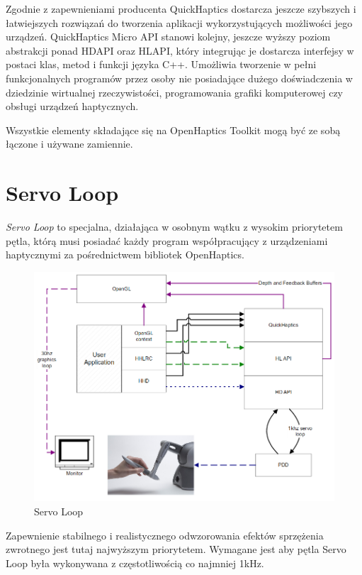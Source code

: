 \documentclass[licencjacka]{pracamgr}
\begin{document}
Zgodnie z zapewnieniami producenta QuickHaptics dostarcza jeszcze szybszych i łatwiejszych rozwiązań do tworzenia aplikacji wykorzystujących możliwości jego urządzeń. QuickHaptics Micro API stanowi kolejny, jeszcze wyższy poziom abstrakcji ponad HDAPI oraz HLAPI, który integrując je dostarcza interfejsy w postaci klas, metod i funkcji języka C++. Umożliwia tworzenie w pełni funkcjonalnych programów przez osoby nie posiadające dużego doświadczenia w dziedzinie wirtualnej rzeczywistości, programowania grafiki komputerowej czy obsługi urządzeń haptycznych.

Wszystkie elementy składające się na OpenHaptics Toolkit mogą być ze sobą łączone i używane zamiennie. 

\section{Servo Loop}
\textit{Servo Loop} to specjalna, działająca w osobnym wątku z wysokim priorytetem pętla, którą musi posiadać każdy program współpracujący z urządzeniami haptycznymi za pośrednictwem bibliotek OpenHaptics.

\begin{figure}[H]
\centering
\includegraphics[scale=0.5,center]{servoloop}
\caption{Servo Loop}
\end{figure}

Zapewnienie stabilnego i realistycznego odwzorowania efektów sprzężenia zwrotnego jest tutaj najwyższym priorytetem. Wymagane jest aby pętla Servo Loop była wykonywana z częstotliwością co najmniej 1kHz.
\end{document}
